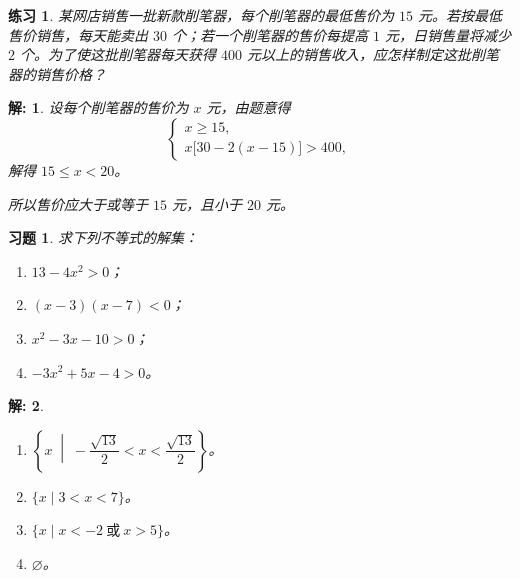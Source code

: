 \documentclass[aspectratio=169,13pt,fleqn,t] {beamer}
\newtheorem*{solve}{解:}
\newtheorem{practice}{练习}
\newtheorem{exercise}{习题}
\begin{document}
\begin{frame}
	\begin{practice}
		某网店销售一批新款削笔器，每个削笔器的最低售价为 $15$ 元。若按最低售价销售，每天能卖出 $30$ 个；若一个削笔器的售价每提高 $1$ 元，日销售量将减少 $2$ 个。为了使这批削笔器每天获得 $400$ 元以上的销售收入，应怎样制定这批削笔器的销售价格？
		
	\end{practice}
	
	\begin{solve}
		
		设每个削笔器的售价为 $x$ 元，由题意得
		\[
		\begin{cases}
			x\geq 15,\\
			x\bigl[30-2(x-15)\bigr]>400,
		\end{cases}
		\]
		解得 $15\leq x<20$。
		
		所以售价应大于或等于 $15$ 元，且小于 $20$ 元。
	\end{solve}
\end{frame}

\begin{frame}
	\begin{exercise}
		求下列不等式的解集：
		\begin{enumerate}[(1)]
			\item $13-4x^2>0$；
			\item  $(x-3)(x-7)<0$；
			\item $x^2-3x-10>0$；
			\item  $-3x^2+5x-4>0$。
		\end{enumerate}
		
		
	\end{exercise}
	
	\begin{solve}
		\begin{enumerate}[(1)]
		
	\item $\left\{x\;\middle|\;-\dfrac{\sqrt{13}}{2}<x<\dfrac{\sqrt{13}}{2}\right\}$。
	
	\item  $\{x\mid 3<x<7\}$。
	
	\item  $\{x\mid x<-2\ \text{或}\ x>5\}$。
	
	\item  $\varnothing$。
	\end{enumerate}
	\end{solve}
\end{frame}
\end{document}
